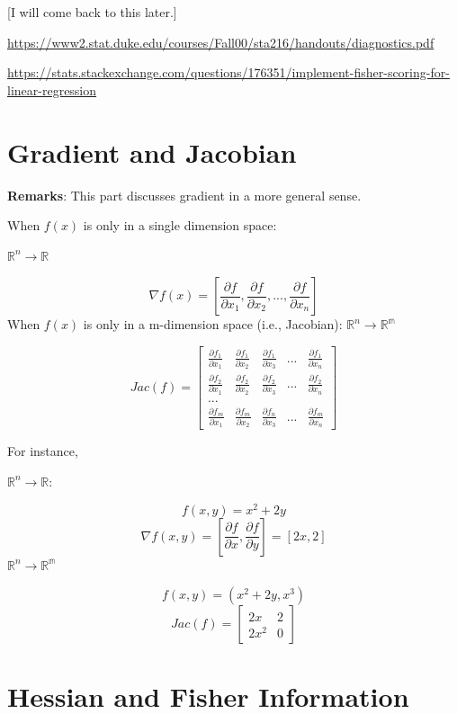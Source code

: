 \documentclass[]{book}
\begin{document}
{[}I will come back to this later.{]}

\url{https://www2.stat.duke.edu/courses/Fall00/sta216/handouts/diagnostics.pdf}

\url{https://stats.stackexchange.com/questions/176351/implement-fisher-scoring-for-linear-regression}

\hypertarget{gradient-and-jacobian}{%
\section{Gradient and Jacobian}\label{gradient-and-jacobian}}

\textbf{Remarks}: This part discusses gradient in a more general sense.

When \(f(x)\) is only in a single dimension space:

\(\mathbb{R}^n \rightarrow \mathbb{R}\)

\[\nabla f(x)=[\frac{\partial f}{\partial x_1},\frac{\partial f}{\partial x_2},...,\frac{\partial f}{\partial x_n}]\]
When \(f(x)\) is only in a m-dimension space (i.e., Jacobian):
\(\mathbb{R}^n \rightarrow \mathbb{R^m}\)

\[Jac(f)=\begin{bmatrix}
\frac{\partial f_1}{\partial x_1} & \frac{\partial f_1}{\partial x_2} & \frac{\partial f_1}{\partial x_3} & ... & \frac{\partial f_1}{\partial x_n}\\
\frac{\partial f_2}{\partial x_1} & \frac{\partial f_2}{\partial x_2} & \frac{\partial f_2}{\partial x_3} & ... & \frac{\partial f_2}{\partial x_n} \\
...\\
\frac{\partial f_m}{\partial x_1} & \frac{\partial f_m}{\partial x_2} & \frac{\partial f_n}{\partial x_3} & ... & \frac{\partial f_m}{\partial x_n}
\end{bmatrix}\]

For instance,

\(\mathbb{R}^n \rightarrow \mathbb{R}\):

\[f(x,y)=x^2+2y\]
\[\nabla f(x,y)=[\frac{\partial f}{\partial x},\frac{\partial f}{\partial y}]=[2x,2]\]
\(\mathbb{R}^n \rightarrow \mathbb{R^m}\)

\[f(x,y)=(x^2+2y,x^3)\]
\[Jac(f)=\begin{bmatrix}
2x & 2\\
2x^2 & 0 
\end{bmatrix}\]

\hypertarget{hessian-and-fisher-information}{%
\section{Hessian and Fisher Information}\label{hessian-and-fisher-information}}
\end{document}
